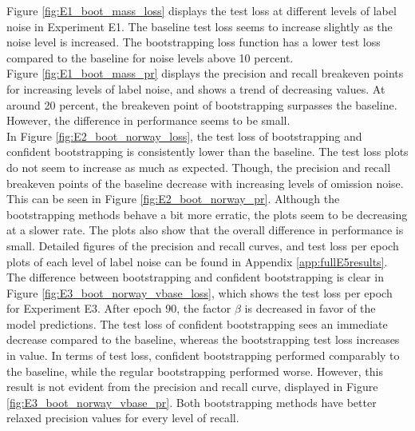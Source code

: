 Figure \ref{fig:E1_boot_mass_loss} displays the test loss at different levels of label noise in Experiment E1. The baseline test loss seems to increase slightly as the noise level is increased. The bootstrapping loss function has a lower test loss compared to the baseline for  noise levels above 10 percent.\\

Figure \ref{fig:E1_boot_mass_pr} displays the precision and recall breakeven points for  increasing levels of label noise, and shows a trend of decreasing values.  At around 20 percent, the breakeven point of bootstrapping surpasses the baseline. However, the difference in performance seems to be small.\\

In Figure \ref{fig:E2_boot_norway_loss}, the test loss of bootstrapping and confident bootstrapping is consistently lower than the baseline. The test loss plots do not seem to increase as much as expected. Though, the precision and recall breakeven points of the baseline decrease with increasing levels of omission noise. This can be seen in Figure \ref{fig:E2_boot_norway_pr}. Although the bootstrapping methods behave a bit more erratic, the plots seem to be decreasing at a slower rate. The plots also show that the overall difference in performance is small. Detailed figures of the precision and recall curves, and test loss per epoch plots of each level of label noise can be found in Appendix \ref{app:fullE5results}. \\

The difference between bootstrapping and confident bootstrapping is clear in Figure \ref{fig:E3_boot_norway_vbase_loss}, which shows the test loss per epoch for Experiment E3. After epoch 90, the factor $\beta$ is decreased in favor of the model predictions. The test loss of confident bootstrapping sees an immediate decrease compared to the baseline, whereas the bootstrapping test loss increases in value. In terms of test loss, confident bootstrapping performed comparably to the baseline, while the regular bootstrapping performed worse. However, this result is not evident from the precision and recall curve, displayed in Figure \ref{fig:E3_boot_norway_vbase_pr}. Both bootstrapping methods have better relaxed precision values  for every level of recall. \\

